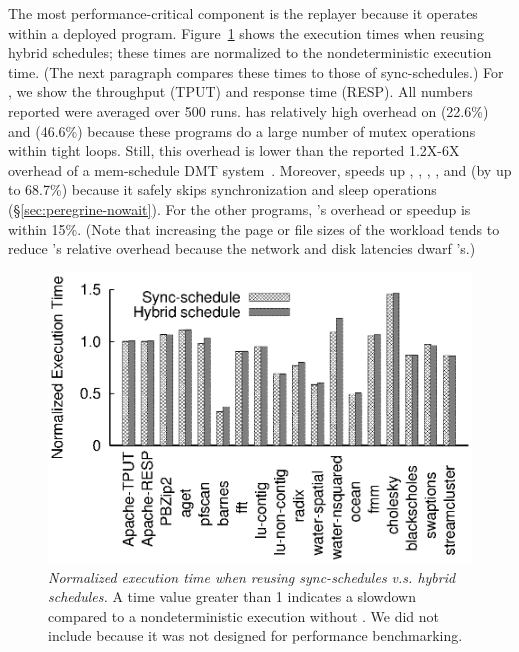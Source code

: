  The most performance-critical component is the
replayer because it operates within a deployed program.
Figure~\ref{fig:peregrine-overhead} shows the execution times when reusing hybrid
schedules; these times are normalized to the nondeterministic
execution time.  (The next paragraph compares these times to those of
sync-schedules.)  For \apache, we show the throughput (TPUT) and response
time (RESP).  All numbers reported were averaged over 500 runs.  \peregrine
has relatively high overhead on \watern (22.6\%) and \cholesky (46.6\%)
because these programs do a large number of mutex operations within tight loops.
Still, this overhead is
lower than the reported 1.2X-6X overhead of a mem-schedule DMT
system~\cite{coredet:asplos10}.  Moreover, \peregrine speeds up \barnes, \lun,
\radix, \waters, and \ocean (by up to 68.7\%) because it safely skips
synchronization and sleep operations (\S\ref{sec:peregrine-nowait}).  For the other
programs, \peregrine's overhead or speedup is within 15\%.  (Note that
increasing the page or file sizes of the workload
tends to reduce \peregrine's relative overhead
because the network and disk latencies dwarf \peregrine's.)

\begin{figure}[t]
\centering
\includegraphics[width=0.9\columnwidth]{peregrine/figures/overhead.eps}
\vspace{-.3in}
\caption{{\em Normalized execution time when reusing sync-schedules
    v.s. hybrid schedules.}  A time value greater than 1
  indicates a slowdown compared to a nondeterministic execution without
  \peregrine.  We did not include \racey because it was not designed for
  performance benchmarking. } \label{fig:peregrine-overhead}
\end{figure}

